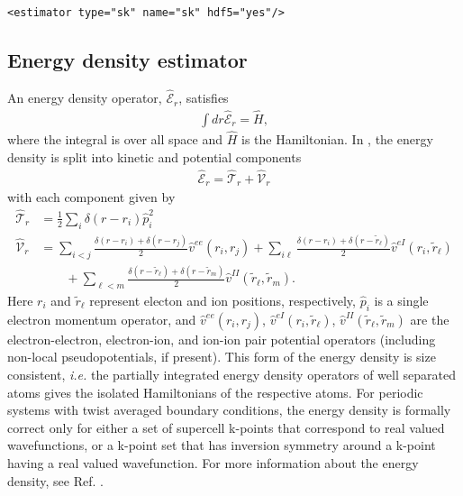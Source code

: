 \begin{lstlisting}[caption=Static structure factor estimator element.]
  <estimator type="sk" name="sk" hdf5="yes"/>
\end{lstlisting}



\subsection{Energy density estimator}
An energy density operator, $\hat{\mathcal{E}}_r$,  satisfies
\begin{align}
  \int dr \hat{\mathcal{E}}_r = \hat{H},
\end{align}
where the integral is over all space and $\hat{H}$ is the Hamiltonian.  In \qmcpack, the energy density is split into kinetic and potential components
\begin{align}
  \hat{\mathcal{E}}_r = \hat{\mathcal{T}}_r + \hat{\mathcal{V}}_r 
\end{align}
with each component given by
\begin{align}
   \hat{\mathcal{T}}_r &=  \frac{1}{2}\sum_i\delta(r-r_i)\hat{p}_i^2 \\  
   \hat{\mathcal{V}}_r &=  \sum_{i<j}\frac{\delta(r-r_i)+\delta(r-r_j)}{2}\hat{v}^{ee}(r_i,r_j)
              + \sum_{i\ell}\frac{\delta(r-r_i)+\delta(r-\tilde{r}_\ell)}{2}\hat{v}^{eI}(r_i,\tilde{r}_\ell) \nonumber\\ 
    &\qquad   + \sum_{\ell< m}\frac{\delta(r-\tilde{r}_\ell)+\delta(r-\tilde{r}_m)}{2}\hat{v}^{II}(\tilde{r}_\ell,\tilde{r}_m).\nonumber
\end{align}
Here $r_i$ and $\tilde{r}_\ell$ represent electon and ion positions, respectively, $\hat{p}_i$ is a single electron momentum operator, and $\hat{v}^{ee}(r_i,r_j)$, $\hat{v}^{eI}(r_i,\tilde{r}_\ell)$, $\hat{v}^{II}(\tilde{r}_\ell,\tilde{r}_m)$ are the electron-electron, electron-ion, and ion-ion pair potential operators (including non-local pseudopotentials, if present).  This form of the energy density is size consistent, \textit{i.e.} the partially integrated energy density operators of well separated atoms gives the isolated Hamiltonians of the respective atoms.  For periodic systems with twist averaged boundary conditions, the energy density is formally correct only for either a set of supercell k-points that correspond to real valued wavefunctions, or a k-point set that has inversion symmetry around a k-point having a real valued wavefunction.  For more information about the energy density, see Ref. \cite{Krogel2013}.

